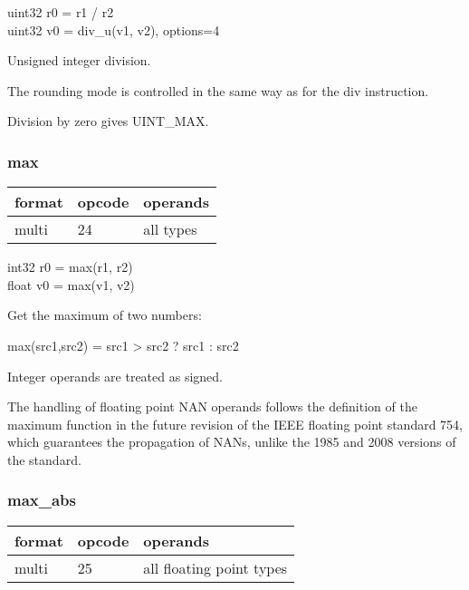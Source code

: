\documentclass[forwardcom.tex]{subfiles}
\begin{document}
uint32 r0 = r1 / r2 \\
uint32 v0 = div\_u(v1, v2), options=4
\vspace{2mm}

Unsigned integer division.

The rounding mode is controlled in the same way as for the div instruction.

\vspace{2mm}
Division by zero gives UINT\_MAX.

\subsubsection{max}
\label{table:maxInstruction}
\begin{tabular}{|p{12mm}|p{12mm}|p{110mm}|}
\hline
\bfseries format & \bfseries opcode & \bfseries operands \\ \hline
multi & 24 & all types \\ \hline
\end{tabular}
\vspace{2mm}

int32 r0 = max(r1, r2) \\
float v0 = max(v1, v2)
\vspace{2mm}

Get the maximum of two numbers:

max(src1,src2) = src1 \textgreater{} src2 ? src1 : src2
\vspace{2mm}

Integer operands are treated as signed.
\vspace{2mm}

The handling of floating point NAN operands follows the definition of the maximum function in the future revision of the IEEE floating point standard 754, which guarantees the propagation of NANs, unlike the 1985 and 2008 versions of the standard.
\vspace{2mm}


\subsubsection{max\_abs}
\label{table:maxAbsInstruction}
\begin{tabular}{|p{12mm}|p{12mm}|p{110mm}|}
\hline
\bfseries format & \bfseries opcode & \bfseries operands \\ \hline
multi & 25 & all floating point types \\ \hline
\end{tabular}
\vspace{2mm}
\end{document}
